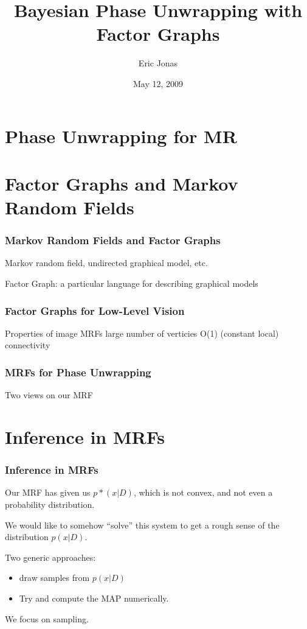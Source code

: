 \documentclass{beamer}
\title{Bayesian Phase Unwrapping with Factor Graphs}
\author{Eric Jonas}
\date{May 12, 2009}
\institute[6.556]{MIT Department of Brain and Cognitive Sciences}
\begin{document}
\begin{frame}
\maketitle
\end{frame}

\section{Phase Unwrapping for MR}


\section{Factor Graphs and Markov Random Fields}
\begin{frame}
\frametitle{Markov Random Fields and Factor Graphs}

Markov random field, undirected graphical model, etc. 

Factor Graph: a particular language for describing graphical models
\cite{Kschischang01}

\end{frame}

\begin{frame} 
\frametitle{Factor Graphs for Low-Level Vision}
Properties of image MRFs
large number of verticies
O(1) (constant local) connectivity
\end{frame}

\begin{frame} 
\frametitle{MRFs for Phase Unwrapping}
Two views on our MRF
\end{frame}

\section{Inference in MRFs}

\begin{frame}
\frametitle{Inference in MRFs}
Our MRF has given us $p*(x | D)$, which is not convex, 
and not even a probability distribution. 

We would like to somehow ``solve'' this system to get a rough
sense of the distribution $p(x |D)$. 

Two generic approaches: 
\begin{itemize}
\item draw samples from $p(x | D)$
\item Try and compute the MAP numerically. 
\end{itemize}
\pause

We focus on sampling. 

\end{frame}
\end{document}
